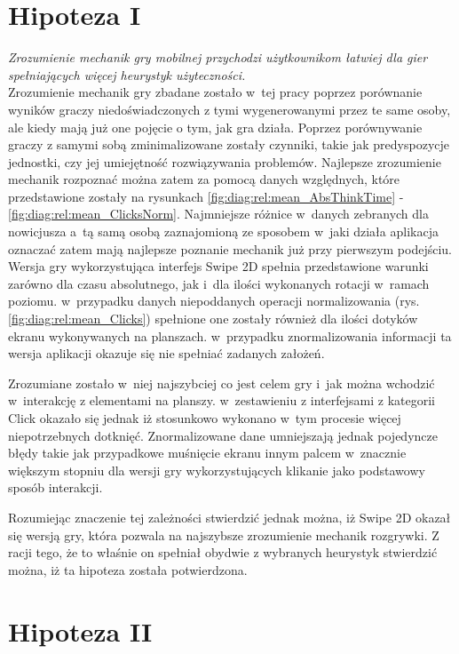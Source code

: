 \documentclass[a4paper,12pt,numbers=noenddot]{report}
\begin{document}
\section{Hipoteza I}
\textit{Zrozumienie mechanik gry mobilnej przychodzi użytkownikom łatwiej dla gier spełniających więcej heurystyk użyteczności.}\\

Zrozumienie mechanik gry zbadane zostało w~tej pracy poprzez porównanie wyników graczy niedoświadczonych z tymi wygenerowanymi przez te same osoby, ale kiedy mają już one pojęcie o tym, jak gra działa. Poprzez porównywanie graczy z samymi sobą zminimalizowane zostały czynniki, takie jak predyspozycje jednostki, czy jej umiejętność rozwiązywania problemów. 
Najlepsze zrozumienie mechanik rozpoznać można zatem za pomocą danych względnych, które przedstawione zostały na rysunkach \ref{fig:diag:rel:mean_AbsThinkTime} - \ref{fig:diag:rel:mean_ClicksNorm}. Najmniejsze różnice w~danych zebranych dla nowicjusza a~tą samą osobą zaznajomioną ze sposobem w~jaki działa aplikacja oznaczać zatem mają najlepsze poznanie mechanik już przy pierwszym podejściu.\\

Wersja gry wykorzystująca interfejs Swipe 2D spełnia przedstawione warunki zarówno dla czasu absolutnego, jak i~dla ilości wykonanych rotacji w~ramach poziomu. w~przypadku danych niepoddanych operacji normalizowania (rys. \ref{fig:diag:rel:mean_Clicks}) spełnione one zostały również dla ilości dotyków ekranu wykonywanych na planszach. w~przypadku znormalizowania informacji ta wersja aplikacji okazuje się nie spełniać zadanych założeń.

Zrozumiane zostało w~niej najszybciej co jest celem gry i~jak można wchodzić w~interakcję z elementami na planszy. w~zestawieniu z interfejsami z kategorii Click okazało się jednak iż stosunkowo wykonano w~tym procesie więcej niepotrzebnych dotknięć. Znormalizowane dane umniejszają jednak pojedyncze błędy takie jak przypadkowe muśnięcie ekranu innym palcem w~znacznie większym stopniu dla wersji gry wykorzystujących klikanie jako podstawowy sposób interakcji. 

Rozumiejąc znaczenie tej zależności stwierdzić jednak można, iż Swipe 2D okazał się wersją gry, która pozwala na najszybsze zrozumienie mechanik rozgrywki. Z racji tego, że to właśnie on spełniał obydwie z wybranych heurystyk stwierdzić można, iż ta hipoteza została potwierdzona.

\section{Hipoteza II}
\end{document}
